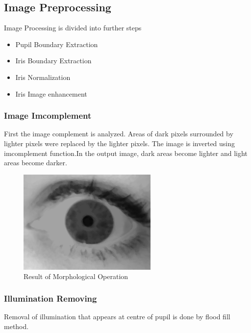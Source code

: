 \documentclass[conference]{Iris_detect}
\begin{document}
\subsection{Image Preprocessing}
Image Processing is divided into further steps
\begin{itemize}
    \item Pupil Boundary Extraction 
    \item Iris Boundary Extraction
    \item Iris Normalization
    \item Iris Image enhancement
\end{itemize}
\subsubsection{Image Imcomplement}First the image complement is analyzed. Areas  of  dark pixels surrounded by lighter pixels were replaced by the lighter pixels. The image is inverted using imcomplement function.In the output image, dark areas become lighter and light areas become darker.

\begin{figure}
\centering
   \includegraphics{Images/morph_operation_screenshot.png}
\caption{Result of Morphological Operation}
\end{figure}
 



\subsubsection{Illumination Removing} Removal of illumination that appears at centre of pupil is done by flood fill method.
\end{document}
